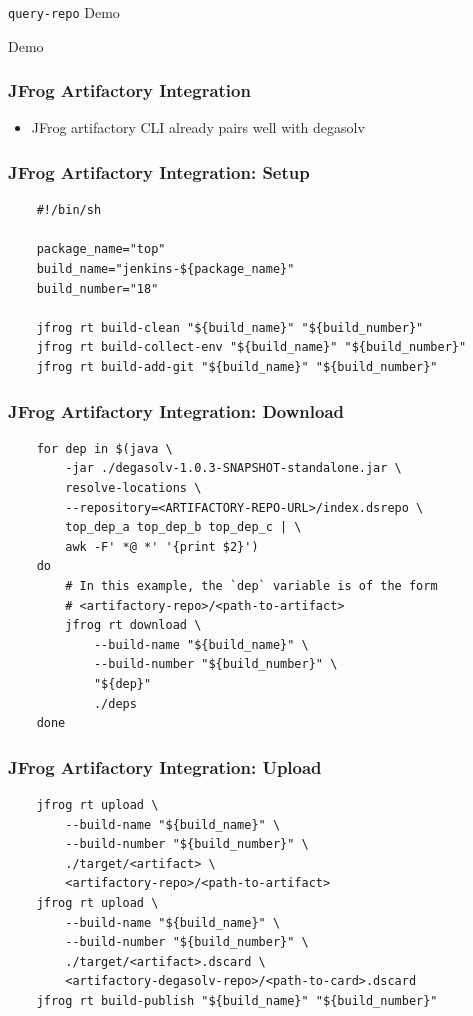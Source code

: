 \documentclass{beamer}
\begin{document}
\begin{frame}
  \centerline{\color{blue}\Large \texttt{query-repo} Demo}
\end{frame}
\begin{frame}
  \centerline{\color{blue}\Large Demo}
\end{frame}
\begin{frame}[fragile]
  \frametitle{JFrog Artifactory Integration}
  \begin{itemize}
  \item JFrog artifactory CLI already pairs well with degasolv
  \end{itemize}
\end{frame}
\begin{frame}[fragile]
\frametitle{JFrog Artifactory Integration: Setup}
\begin{verbatim}
    #!/bin/sh

    package_name="top"
    build_name="jenkins-${package_name}"
    build_number="18"

    jfrog rt build-clean "${build_name}" "${build_number}"
    jfrog rt build-collect-env "${build_name}" "${build_number}"
    jfrog rt build-add-git "${build_name}" "${build_number}"
\end{verbatim}
\end{frame}
\begin{frame}[fragile]
\frametitle{JFrog Artifactory Integration: Download}
\begin{verbatim}
    for dep in $(java \
        -jar ./degasolv-1.0.3-SNAPSHOT-standalone.jar \
        resolve-locations \
        --repository=<ARTIFACTORY-REPO-URL>/index.dsrepo \
        top_dep_a top_dep_b top_dep_c | \
        awk -F' *@ *' '{print $2}')
    do
        # In this example, the `dep` variable is of the form
        # <artifactory-repo>/<path-to-artifact>
        jfrog rt download \
            --build-name "${build_name}" \
            --build-number "${build_number}" \
            "${dep}"
            ./deps
    done
\end{verbatim}
\end{frame}
\begin{frame}[fragile]
\frametitle{JFrog Artifactory Integration: Upload}
\begin{verbatim}
    jfrog rt upload \
        --build-name "${build_name}" \
        --build-number "${build_number}" \
        ./target/<artifact> \
        <artifactory-repo>/<path-to-artifact>
    jfrog rt upload \
        --build-name "${build_name}" \
        --build-number "${build_number}" \
        ./target/<artifact>.dscard \
        <artifactory-degasolv-repo>/<path-to-card>.dscard
    jfrog rt build-publish "${build_name}" "${build_number}"

\end{verbatim}
\end{frame}
\end{document}
